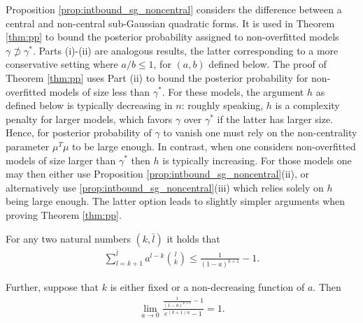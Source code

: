 Proposition \ref{prop:intbound_sg_noncentral} considers the difference between a central and non-central sub-Gaussian quadratic forms. It is used in Theorem \ref{thm:pp} to bound the posterior probability assigned to non-overfitted models $\gamma \not\supset \gamma^*$.
Parts (i)-(ii) are analogous results, the latter corresponding to a more conservative setting where $a/b \leq 1$, for $(a,b)$ defined below.
The proof of Theorem \ref{thm:pp} uses Part (ii) to bound the posterior probability for non-overfitted models of size less than $\gamma^*$.
For these models, the argument $h$ as defined below is typically decreasing in $n$: roughly speaking, $h$ is a complexity penalty for larger models, which favors $\gamma$ over $\gamma^*$ if the latter has larger size. Hence, for posterior probability of $\gamma$ to vanish one must rely on the non-centrality parameter $\mu^T\mu$ to be large enough.
In contrast, when one considers non-overfitted models of size larger than $\gamma^*$ then $h$ is typically increasing. For those models one may then either use Proposition \ref{prop:intbound_sg_noncentral}(ii), or alternatively use \ref{prop:intbound_sg_noncentral}(iii) which relies solely on $h$ being large enough. The latter option leads to slightly simpler arguments when proving Theorem \ref{thm:pp}.



\begin{lemma}
For any two natural numbers $(k,\bar{l})$ it holds that
\begin{align}
 \sum_{l=k+1}^{\bar{l}} a^{l-k} {l \choose k} \leq \frac{1}{(1-a)^{k+1}} - 1.
\nonumber
\end{align}

Further, suppose that $k$ is either fixed or a non-decreasing function of $a$. Then
\begin{align}
 \lim_{a \rightarrow 0  } \frac{\frac{1}{(1 - a)^{k+1}} -1 }{e^{(k+1)a} -1}= 1.
\nonumber
\end{align}
\label{slem:binomial_ogf}
\end{lemma}





